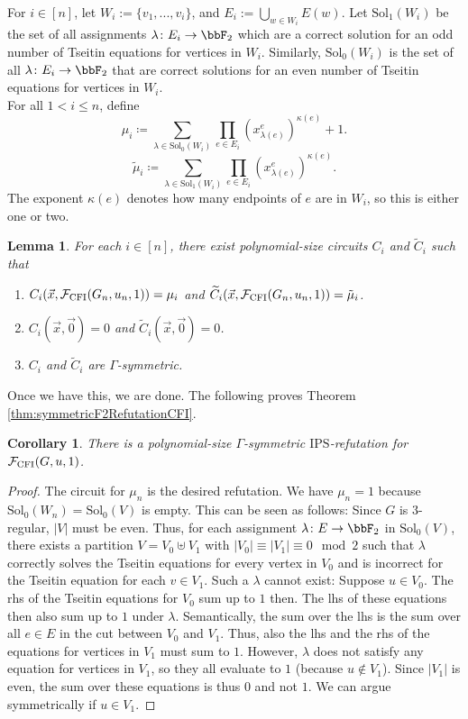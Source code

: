 \documentclass[10pt,a4paper]{article}
\newtheorem{lemma}[theorem]{Lemma}
\newtheorem{corollary}[theorem]{Corollary}
\newcommand{\IPS}{\mathrm{IPS}}
\newcommand{\Ff}{{\cal F}}
\newcommand{\CFI}{\Ff_{\mathrm{CFI}}}
\newcommand{\mutilde}{\tilde{\mu}}
\begin{document}
For $i \in [n]$, let $W_i := \{v_1,...,v_i\}$, and $E_i := \bigcup_{w \in W_i} E(w)$. Let $\text{Sol}_1(W_i)$ be the set of all assignments $\lambda \colon E_i \to \bbF_2$ which are a correct solution for an odd number of Tseitin equations for vertices in $W_i$. Similarly, $\text{Sol}_0(W_i)$ is the set of all $\lambda \colon E_i \to \bbF_2$ that are correct solutions for an even number of Tseitin equations for vertices in $W_i$.\\
For all $1 < i \leq n$, define
\[
\mu_i \coloneqq  \sum_{\lambda \in \text{Sol}_0(W_i)} \prod_{e \in E_i} (x_{\lambda(e)}^{e} )^{\kappa(e)} + 1.
\]
\[
\mutilde_i \coloneqq \sum_{\lambda \in \text{Sol}_1(W_i)} \prod_{e \in E_i} (x_{\lambda(e)}^{e})^{\kappa(e)}.
\]
The exponent $\kappa(e)$ denotes how many endpoints of $e$ are in $W_i$, so this is either one or two.
\begin{lemma}
	\label{lem:computingMu}
	For each $i \in [n]$, there exist polynomial-size circuits $C_i$ and $\widetilde{C}_i$ such that 
	\begin{enumerate}
		\item $C_i(\vec x, \CFI(G_n, u_n, 1)) = \mu_i$ and $\widetilde{C}_i(\vec x, \CFI(G_n, u_n, 1)) = \mutilde_i$. 
		\item $C_i(\vec x, \vec 0) = 0$ and $\widetilde{C}_i(\vec x, \vec 0) = 0$.
		\item $C_i$ and $\widetilde{C}_i$ are $\Gamma$-symmetric.
	\end{enumerate}	
\end{lemma}

Once we have this, we are done. The following proves Theorem \ref{thm:symmetricF2RefutationCFI}.
\begin{corollary}
	\label{cor:symRefutationCFI}
	There is a polynomial-size $\Gamma$-symmetric $\IPS$-refutation for $\CFI(G, u, 1)$.
\end{corollary}
\begin{proof}
	The circuit for $\mu_n$ is the desired refutation.
	We have $\mu_n = 1$ because $\text{Sol}_0(W_n) = \text{Sol}_0(V)$ is empty. This can be seen as follows: Since $G$ is $3$-regular, $|V|$ must be even. Thus, for each assignment $\lambda\colon E \to \bbF_2$ in $\text{Sol}_0(V)$, there exists a partition $V = V_0 \uplus V_1$ with $|V_0| \equiv |V_1| \equiv 0 \mod 2$ such that $\lambda$ correctly solves the Tseitin equations for every vertex in $V_0$ and is incorrect for the Tseitin equation for each $v \in V_1$. 
	Such a $\lambda$ cannot exist: Suppose $u \in V_0$. The rhs of the Tseitin equations for $V_0$ sum up to $1$ then. The lhs of these equations then also sum up to $1$ under $\lambda$. Semantically, the sum over the lhs is the sum over all $e \in E$ in the cut between $V_0$ and $V_1$. Thus, also the lhs and the rhs of the equations for vertices in $V_1$ must sum to $1$. However, $\lambda$ does not satisfy any equation for vertices in $V_1$, so they all evaluate to $1$ (because $u \notin V_1$). Since $|V_1|$ is even, the sum over these equations is thus $0$ and not $1$. We can argue symmetrically if $u \in V_1$. 
\end{proof}	
\end{document}
